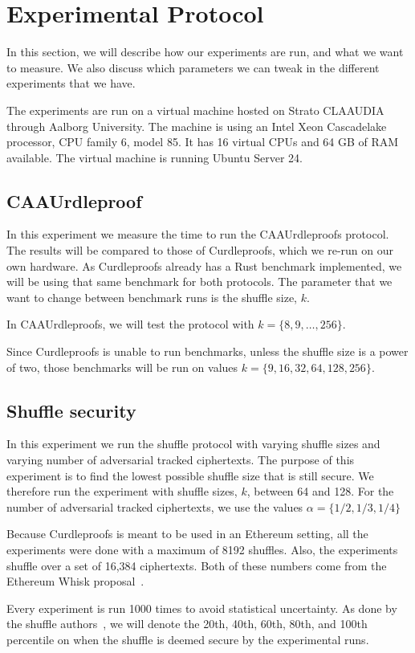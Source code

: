 
\section{Experimental Protocol}\label{sec:experimental-protocol}
In this section, we will describe how our experiments are run, and what we want to measure.
We also discuss which parameters we can tweak in the different experiments that we have.

The experiments are run on a virtual machine hosted on Strato CLAAUDIA through Aalborg University.
The machine is using an Intel Xeon Cascadelake processor, CPU family 6, model 85.
It has 16 virtual CPUs and 64 GB of RAM available.
The virtual machine is running Ubuntu Server 24.


\subsection{CAAUrdleproof}\label{sec:experimental-protocol-size}
In this experiment we measure the time to run the CAAUrdleproofs protocol.
The results will be compared to those of Curdleproofs, which we re-run on our own hardware.
As Curdleproofs already has a Rust benchmark implemented, we will be using that same benchmark for both protocols.
The parameter that we want to change between benchmark runs is the shuffle size, $k$.

In CAAUrdleproofs, we will test the protocol with $k=\{8,9,\dots,256\}$.

Since Curdleproofs is unable to run benchmarks, unless the shuffle size is a power of two, those benchmarks will be run on values $k=\{9,16,32,64,128,256\}$.




\subsection{Shuffle security}\label{subsec:experimental-protocol-shuffle-security}
In this experiment we run the shuffle protocol with varying shuffle sizes and varying number of adversarial tracked ciphertexts.
The purpose of this experiment is to find the lowest possible shuffle size that is still secure.
We therefore run the experiment with shuffle sizes, $k$, between 64 and 128.
For the number of adversarial tracked ciphertexts, we use the values $\alpha=\{1/2,1/3,1/4\}$

Because Curdleproofs is meant to be used in an Ethereum setting, all the experiments were done with a maximum of 8192 shuffles.
Also, the experiments shuffle over a set of 16,384 ciphertexts.
Both of these numbers come from the Ethereum Whisk proposal~\cite{Whisk2024}.


Every experiment is run 1000 times to avoid statistical uncertainty.
As done by the shuffle authors~\cite{cryptoeprint:2022/560}, we will denote the 20th, 40th, 60th, 80th, and 100th percentile on when the shuffle is deemed secure by the experimental runs.

